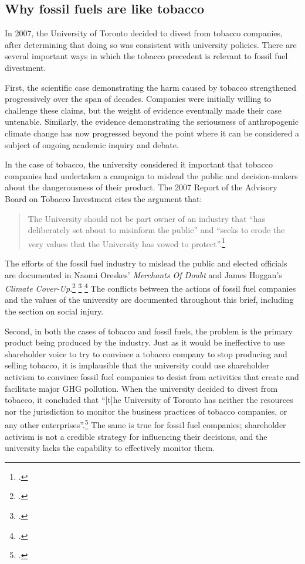 \documentclass[10pt]{article}
\begin{document}
	\subsection{Why fossil fuels are like tobacco}
	\label{sec:LikeTobacco}



In 2007, the University of Toronto decided to divest from tobacco companies, after determining that doing so was consistent with university policies.
There are several important ways in which the tobacco precedent is relevant to fossil fuel divestment.



First, the scientific case demonstrating the harm caused by tobacco strengthened progressively over the span of decades.
Companies were initially willing to challenge these claims, but the weight of evidence eventually made their case untenable.
Similarly, the evidence demonstrating the seriousness of anthropogenic climate change has now progressed beyond the point where it can be considered a subject of ongoing academic inquiry and debate.



In the case of tobacco, the university considered it important that tobacco companies had undertaken a campaign to mislead the public and decision-makers about the dangerousness of their product.
The 2007 Report of the Advisory Board on Tobacco Investment cites the argument that:
\begin{quote}
The University should not be part owner of an industry that ``has deliberately set about to misinform the public'' and ``seeks to erode the very values that the University has vowed to protect''.\footcite[][p. 5]{TobaccoReport_2007}
\end{quote}
The efforts of the fossil fuel industry to mislead the public and elected officials are documented in Naomi Oreskes' \emph{Merchants Of Doubt} and James Hoggan's \emph{Climate Cover-Up}.\footcite[][]{MerchantsDoubt} \footcite[][]{ClimateCoverUp} \footcite[See also: ][]{ExxonTobacco2007}
The conflicts between the actions of fossil fuel companies and the values of the university are documented throughout this brief, including the section on social injury.



Second, in both the cases of tobacco and fossil fuels, the problem is the primary product being produced by the industry.
Just as it would be ineffective to use shareholder voice to try to convince a tobacco company to stop producing and selling tobacco, it is implausible that the university could use shareholder activism to convince fossil fuel companies to desist from activities that create and facilitate major GHG pollution.
When the university decided to divest from tobacco, it concluded that ``[t]he University of Toronto has neither the resources nor the jurisdiction to monitor the business practices of tobacco companies, or any other enterprises''.\footcite[][p. 7]{TobaccoReport_2007}
The same is true for fossil fuel companies; shareholder activism is not a credible strategy for influencing their decisions, and the university lacks the capability to effectively monitor them.
\end{document}
